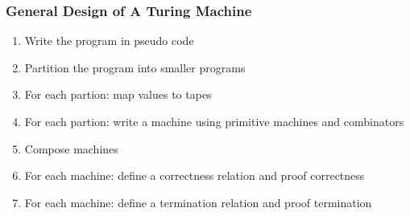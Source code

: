 \documentclass{beamer} %
\begin{document}
\begin{frame}
  \frametitle{General Design of A Turing Machine}
  \begin{enumerate}
  \item Write the program in pseudo code
  \item Partition the program into smaller programs
  \item For each partion: map values to tapes
  \item For each partion: write a machine using primitive machines and combinators
  \item Compose machines
  \item For each machine: define a correctness relation and proof correctness
  \item For each machine: define a termination relation and proof termination
  \end{enumerate}
\end{frame}
\end{document}
